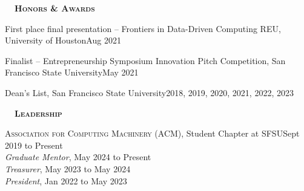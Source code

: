 \documentclass[hidelinks, 10pt]{article}
\def\sectionspacing{5mm}            %
\def\sectiontocontentspacing{4mm}   %
\renewcommand{\section}[1]{
    {\fontsize{14}{14}\selectfont \textsc{\textbf{\ \ #1\ \ }}}\hrulefill
}
\begin{document}
\vspace{\sectionspacing}


\section{Honors \& Awards}

\vspace{\sectiontocontentspacing}

\begin{minipage}[ct]{0.9\linewidth}
    First place final presentation -- Frontiers in Data-Driven Computing REU,
    University of Houston\hfill Aug 2021

    \vspace{1.5mm}

    Finalist -- Entrepreneurship Symposium Innovation Pitch Competition, San
    Francisco State University\hfill May 2021

    \vspace{1.5mm}

    Dean's List, San Francisco State University\hfill 2018, 2019, 2020, 2021, 2022, 2023
\end{minipage}

\vspace*{\fill}
\pagebreak
{}
\vspace*{\fill}


\vspace{\sectionspacing}
\section{Leadership}
\vspace{\sectiontocontentspacing}

\begin{minipage}[ct]{0.9\linewidth}
    \textsc{Association for Computing Machinery} (ACM), Student Chapter at SFSU\hfill Sept 2019 to Present\\
    \emph{Graduate Mentor}, May 2024 to Present\\
    \emph{Treasurer}, May 2023 to May 2024\\
    \emph{President}, Jan 2022 to May 2023
\end{minipage}
\end{document}
